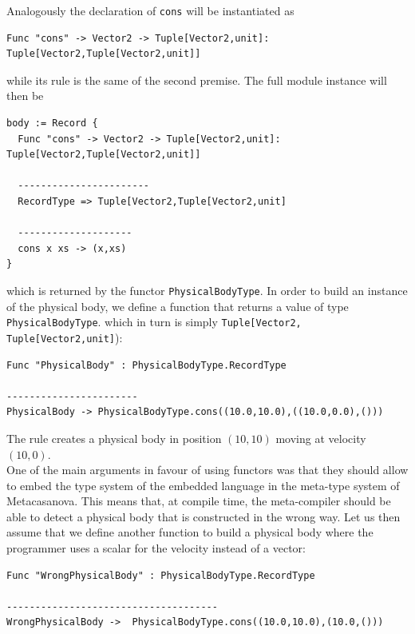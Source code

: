 \noindent
Analogously the declaration of \texttt{cons} will be instantiated as

\begin{lstlisting}
Func "cons" -> Vector2 -> Tuple[Vector2,unit]: Tuple[Vector2,Tuple[Vector2,unit]]
\end{lstlisting}

\noindent
while its rule is the same of the second premise. The full module instance will then be

\begin{lstlisting}
body := Record {
  Func "cons" -> Vector2 -> Tuple[Vector2,unit]: Tuple[Vector2,Tuple[Vector2,unit]]
  
  -----------------------
  RecordType => Tuple[Vector2,Tuple[Vector2,unit]
  
  --------------------
  cons x xs -> (x,xs)
}
\end{lstlisting}

\noindent
which is returned by the functor \texttt{PhysicalBodyType}. In order to build an instance of the physical body, we define a function that returns a value of type \texttt{PhysicalBodyType}. which in turn is simply \texttt{Tuple[Vector2,\\Tuple[Vector2,unit]}):

\begin{lstlisting}
Func "PhysicalBody" : PhysicalBodyType.RecordType

-----------------------
PhysicalBody -> PhysicalBodyType.cons((10.0,10.0),((10.0,0.0),()))
\end{lstlisting}

\noindent
The rule creates a physical body in position $(10,10)$ moving at velocity $(10,0)$.\\

One of the main arguments in favour of using functors was that they should allow to embed the type system of the embedded language in the meta-type system of Metacasanova. This means that, at compile time, the meta-compiler should be able to detect a physical body that is constructed in the wrong way. Let us then assume that we define another function to build a physical body where the programmer uses a scalar for the velocity instead of a vector:

\begin{lstlisting}
Func "WrongPhysicalBody" : PhysicalBodyType.RecordType

-------------------------------------
WrongPhysicalBody ->  PhysicalBodyType.cons((10.0,10.0),(10.0,()))
\end{lstlisting}

